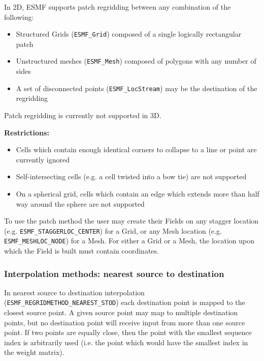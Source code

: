 \smallskip

 In 2D, ESMF supports patch regridding between any combination of the following:
 \begin{itemize}
 \item Structured Grids ({\tt ESMF\_Grid}) composed of a single logically rectangular patch
 \item Unstructured meshes ({\tt ESMF\_Mesh}) composed of polygons with any number of sides
 \item A set of disconnected points ({\tt ESMF\_LocStream}) may be the destination of the regridding
 \end{itemize}

\smallskip

 Patch regridding is currently not supported in 3D.

\smallskip

{\bf Restrictions:}
 \begin{itemize}
 \item Cells which contain enough identical corners to collapse to a line or point are currently ignored
 \item Self-intersecting cells (e.g. a cell twisted into a bow tie) are not supported
 \item On a spherical grid, cells which contain an edge which extends more than half way around the sphere are not supported 
 \end{itemize}

 To use the patch method the user may create their Fields on any stagger location (e.g. {\tt ESMF\_STAGGERLOC\_CENTER}) for a Grid, or
 any Mesh location (e.g. {\tt ESMF\_MESHLOC\_NODE}) for a Mesh. For either a Grid or a Mesh, the location upon which the Field is built 
 must contain coordinates. 

\subsubsection{Interpolation methods: nearest source to destination}\label{sec:interpolation:neareststod}
In nearest source to destination interpolation ({\tt ESMF\_REGRIDMETHOD\_NEAREST\_STOD}) each destination point is mapped to the closest source point. A given source point may map to multiple destination points, but no destination point will receive input from more than one source point. If two points are equally close, then the point with the smallest sequence index is arbitrarily used (i.e. the point which would have the smallest index in the weight matrix). 

